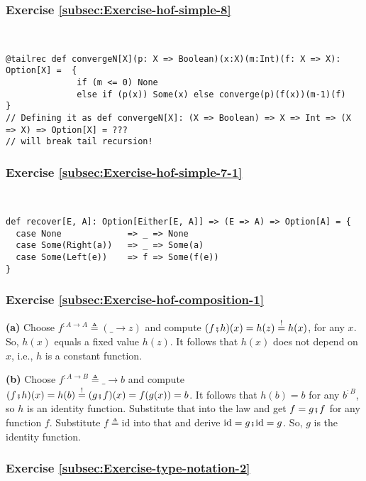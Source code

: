 
\subsubsection*{Exercise \ref{subsec:Exercise-hof-simple-8}}

~
\begin{lstlisting}
@tailrec def convergeN[X](p: X => Boolean)(x:X)(m:Int)(f: X => X): Option[X] =  {
              if (m <= 0) None
              else if (p(x)) Some(x) else converge(p)(f(x))(m-1)(f)             }
// Defining it as def convergeN[X]: (X => Boolean) => X => Int => (X => X) => Option[X] = ???
// will break tail recursion!
\end{lstlisting}


\subsubsection*{Exercise \ref{subsec:Exercise-hof-simple-7-1}}

~
\begin{lstlisting}
def recover[E, A]: Option[Either[E, A]] => (E => A) => Option[A] = {
  case None             => _ => None
  case Some(Right(a))   => _ => Some(a)
  case Some(Left(e))    => f => Some(f(e))
}
\end{lstlisting}


\subsubsection*{Exercise \ref{subsec:Exercise-hof-composition-1}}

\textbf{(a)} Choose $f^{:A\rightarrow A}\triangleq(\_\rightarrow z)$
and compute $(f\bef h)(x)=h(z)\overset{!}{=}h(x)$, for any $x$.
So, $h(x)$ equals a fixed value $h(z)$. It follows that $h(x)$
does not depend on $x$, i.e., $h$ is a constant function.

\textbf{(b)} Choose $f^{:A\rightarrow B}\triangleq\_\rightarrow b$
and compute $(f\bef h)(x)=h(b)\overset{!}{=}(g\bef f)(x)=f(g(x))=b$.
It follows that $h(b)=b$ for any $b^{:B}$, so $h$ is an identity
function. Substitute that into the law and get $f=g\bef f$ for any
function $f$. Substitute $f\triangleq\text{id}$ into that and derive
$\text{id}=g\bef\text{id}=g$. So, $g$ is the identity function.


\subsubsection*{Exercise \ref{subsec:Exercise-type-notation-2}}


